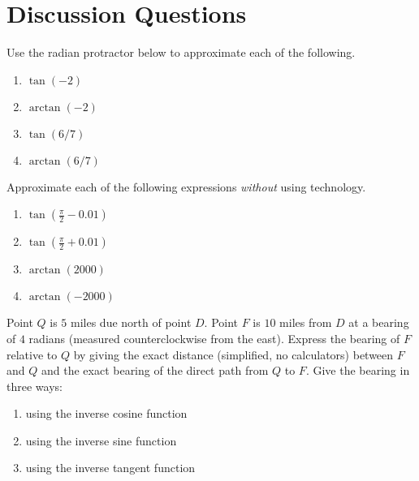 \documentclass{ximera}
\begin{document}
\section{Discussion Questions}

\begin{question} \label{Q45TRETFGree}
Use the radian protractor below to approximate each of the following.
\begin{enumerate}
\item $\tan(-2)$

\item $\arctan(-2)$

\item $\tan(6/7)$

\item $\arctan(6/7)$
\end{enumerate}

 
\begin{onlineOnly}
    \begin{center}
\end{center}
\end{onlineOnly}


\end{question}

\begin{question} \label{Q45rREERwer}
Approximate each of the following expressions \emph{without} using technology.
\begin{enumerate}
\item $\tan \left(\frac{\pi}{2} - 0.01\right)$

\item $\tan \left(\frac{\pi}{2} + 0.01 \right)$

\item $\arctan(2000)$

\item $\arctan(-2000)$
\end{enumerate}

\end{question}

\begin{question} \label{QER34rRER}
Point $Q$ is $5$ miles due north of point $D$. Point $F$ is $10$ miles from $D$ at a bearing of $4$ radians (measured counterclockwise from the east). Express the bearing of $F$ relative to $Q$ by giving the exact distance (simplified, no calculators) between $F$ and $Q$ and the exact bearing of the direct path from $Q$ to $F$. Give the bearing in three ways:

\begin{enumerate}
\item using the inverse cosine function

\item using the inverse sine function

\item using the inverse tangent function

\end{enumerate}
\end{question}
\end{document}
